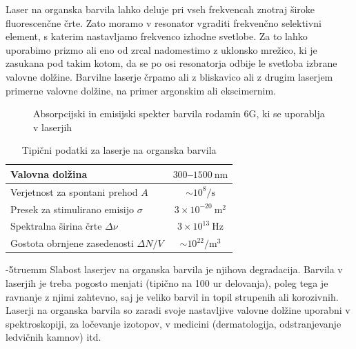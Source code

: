 Laser na organska barvila lahko deluje pri vseh frekvencah znotraj široke
fluorescenčne črte. Zato moramo v resonator vgraditi frekvenčno
selektivni element, s katerim nastavljamo frekvenco izhodne svetlobe. Za to lahko 
uporabimo prizmo ali eno od zrcal nadomestimo 
z uklonsko mrežico, ki je zasukana pod takim kotom, da se po osi resonatorja odbije le svetloba
izbrane valovne dolžine.
Barvilne laserje črpamo ali z bliskavico ali z drugim laserjem primerne 
valovne dolžine, na primer argonskim ali ekscimernim.

\begin{figure}[ht]
\centering
\def\svgwidth{70truemm} 

\caption{Absorpcijski in emisijski spekter barvila rodamin 6G, ki se uporablja v laserjih}
\label{fig:RhG}
\end{figure} 
\begin{table}[ht]
\begin{center}
\begin{tabular}{|l|c|}\hline
Valovna dolžina  & $300$--$1500~\si{\nano\meter}$\\ \hline
Verjetnost za spontani prehod $A$ & $ \sim 10^8/\si{\second}$ \\ \hline
Presek za stimulirano emisijo $\sigma$ & $3 \times 10^{-20}~\si{\metre}^2$ \\ \hline
Spektralna širina črte $\Delta \nu$ & $3 \times 10^{13}~\si{\hertz}$  \\ \hline
Gostota obrnjene zasedenosti $\Delta N/V$ & $ \sim 10^{22}/\si{\metre}^3$ \\ \hline
\end{tabular}
\caption{Tipični podatki za laserje na organska barvila}
\label{tab:orgb}
\end{center}
\end{table}
\vglue-5truemm
Slabost laserjev na organska barvila je njihova degradacija. Barvila v
laserjih je treba pogosto menjati (tipično na 100 ur delovanja), poleg tega je ravnanje
z njimi zahtevno, saj je veliko barvil in topil strupenih ali korozivnih.
Laserji na organska barvila so zaradi svoje nastavljive valovne dolžine
uporabni v spektroskopiji, za ločevanje izotopov, v 
medicini (dermatologija, odstranjevanje ledvičnih kamnov) itd.
 
